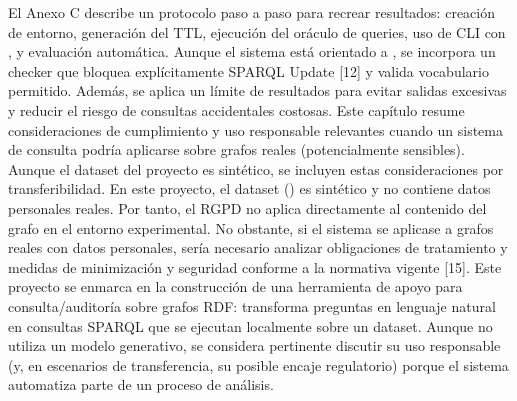 \markdownRendererUlEndTight \markdownRendererInterblockSeparator
{}\markdownRendererInterblockSeparator
{}El Anexo C describe un protocolo paso a paso para recrear resultados: creación de entorno, generación del TTL, ejecución del oráculo de queries, uso de CLI con , y evaluación automática.\markdownRendererInterblockSeparator
{}\markdownRendererInterblockSeparator
{}Aunque el sistema está orientado a , se incorpora un checker que bloquea explícitamente SPARQL Update [12] y valida vocabulario permitido. Además, se aplica un límite de resultados para evitar salidas excesivas y reducir el riesgo de consultas accidentales costosas.\markdownRendererInterblockSeparator
{}\markdownRendererHorizontalRule{}\markdownRendererInterblockSeparator
{}\markdownRendererInterblockSeparator
{}Este capítulo resume consideraciones de cumplimiento y uso responsable relevantes cuando un sistema de consulta podría aplicarse sobre grafos reales (potencialmente sensibles). Aunque el dataset del proyecto es sintético, se incluyen estas consideraciones por transferibilidad.\markdownRendererInterblockSeparator
{}\markdownRendererInterblockSeparator
{}En este proyecto, el dataset () es sintético y no contiene datos personales reales. Por tanto, el RGPD no aplica directamente al contenido del grafo en el entorno experimental. No obstante, si el sistema se aplicase a grafos reales con datos personales, sería necesario analizar obligaciones de tratamiento y medidas de minimización y seguridad conforme a la normativa vigente [15].\markdownRendererInterblockSeparator
{}\markdownRendererInterblockSeparator
{}Este proyecto se enmarca en la construcción de una herramienta de apoyo para consulta/auditoría sobre grafos RDF: transforma preguntas en lenguaje natural en consultas SPARQL que se ejecutan localmente sobre un dataset. Aunque no utiliza un modelo generativo, se considera pertinente discutir su uso responsable (y, en escenarios de transferencia, su posible encaje regulatorio) porque el sistema automatiza parte de un proceso de análisis.\markdownRendererInterblockSeparator
{}\markdownRendererInterblockSeparator
